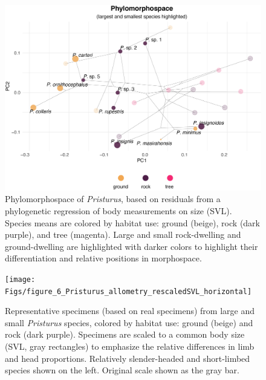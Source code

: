 \documentclass[
  11pt,
]{article}
\begin{document}
\newpage

\begin{figure}

{\centering \includegraphics[width=1\linewidth]{Figs/figure_5_phylomorphospace_large_small} 

}

\caption{Phylomorphospace of \textit{Pristurus}, based on residuals from a phylogenetic regression of body measurements on size (SVL). Species means are colored by habitat use: ground (beige), rock (dark purple), and tree (magenta). Large and small rock-dwelling and ground-dwelling are highlighted with darker colors to highlight their differentiation and relative positions in morphospace.}\label{fig:unnamed-chunk-8}
\end{figure}

\newpage

\begin{figure}

{\centering \texttt{[image: Figs/figure\_6\_Pristurus\_allometry\_rescaledSVL\_horizontal]} 

}

\caption{Representative specimens (based on real specimens) from large and small \textit{Pristurus} species, colored by habitat use: ground (beige) and rock (dark purple). Specimens are scaled to a common body size (SVL, gray rectangles) to emphasize the relative differences in limb and head proportions. Relatively slender-headed and short-limbed species shown on the left. Original scale shown as the gray bar.}\label{fig:unnamed-chunk-9}
\end{figure}
\end{document}
